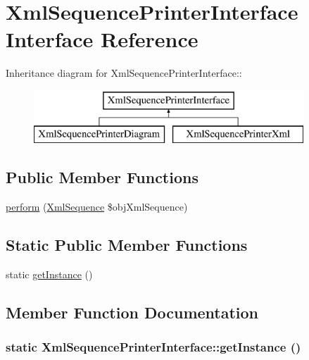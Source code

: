 \hypertarget{interface_xml_sequence_printer_interface}{
\section{XmlSequencePrinterInterface Interface Reference}
\label{interface_xml_sequence_printer_interface}
}
Inheritance diagram for XmlSequencePrinterInterface::\begin{figure}[H]
\begin{center}
\leavevmode
\includegraphics[height=2cm]{interface_xml_sequence_printer_interface}
\end{center}
\end{figure}
\subsection*{Public Member Functions}
\begin{CompactItemize}
\item 
\hyperlink{interface_xml_sequence_printer_interface_68a8066e69c402d49dd0a16a22cfcb6b}{perform} (\hyperlink{class_xml_sequence}{XmlSequence} \$objXmlSequence)
\end{CompactItemize}
\subsection*{Static Public Member Functions}
\begin{CompactItemize}
\item 
static \hyperlink{interface_xml_sequence_printer_interface_d488a9fe62e4e3018e482d31497d5e99}{getInstance} ()
\end{CompactItemize}


\subsection{Member Function Documentation}
\hypertarget{interface_xml_sequence_printer_interface_d488a9fe62e4e3018e482d31497d5e99}{
\subsubsection[{getInstance}]{\setlength{\rightskip}{0pt plus 5cm}static XmlSequencePrinterInterface::getInstance ()}}
\label{interface_xml_sequence_printer_interface_d488a9fe62e4e3018e482d31497d5e99}


